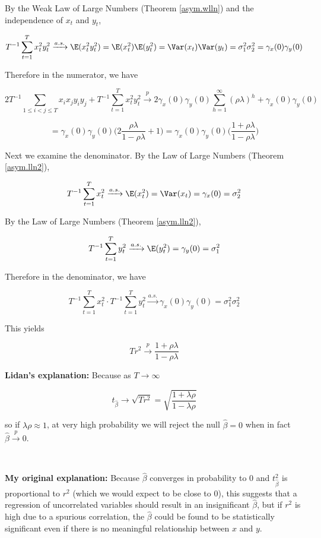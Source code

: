 \begin{enumerate}[(a)]
By the Weak Law of Large Numbers (Theorem \ref{asym.wlln}) and the independence of \(x_t\) and \(y_t\),

\[
T^{-1}\sum_{t=1}^T x_t^2y_t^2 \xrightarrow{a.s.} \E(x_t^2 y_t^2) = \E(x_t^2) \E( y_t^2) = \Var(x_t) \Var(y_t) = \sigma_1^2 \sigma_2^2 = \gamma_x(0) \gamma_y(0)
\]

Therefore in the numerator, we have

\[
2T^{-1} \sum_{1 \leq i < j \leq T} x_ix_j y_i y_j + T^{-1}\sum_{t=1}^T x_t^2y_t^2 \xrightarrow{p} 2 \gamma_x(0) \gamma_y(0)   \sum_{h=1}^{\infty}    (\rho \lambda)^h  + \gamma_x(0) \gamma_y(0) 
\]

\[
=  \gamma_x(0) \gamma_y(0)  \bigg( 2 \frac{\rho \lambda}{1 - \rho \lambda}     +1 \bigg)  =  \gamma_x(0) \gamma_y(0)  \bigg(  \frac{1 + \rho \lambda}{1 - \rho \lambda}      \bigg) 
\]

Next we examine the denominator. By the Law of Large Numbers (Theorem \ref{asym.lln2}),

\[
T^{-1}\sum_{t=1}^T x_t^2 \xrightarrow{a.s.} \E(x_t^2) = \Var(x_t) =  \gamma_x(0) = \sigma_2^2
\]

By the Law of Large Numbers (Theorem \ref{asym.lln2}),

\[
T^{-1}\sum_{t=1}^T y_t^2 \xrightarrow{a.s.} \E(y_t^2)  = \gamma_y(0) = \sigma_1^2
\]

Therefore in the denominator, we have

\[
T^{-1}\sum_{t=1}^T x_t^2 \cdot T^{-1} \sum_{t=1}^T y_t^2  \xrightarrow{a.s.} \gamma_x(0) \gamma_y(0) = \sigma_1^2 \sigma_2^2
\]

This yields

\[
\boxed{
Tr^2 \xrightarrow{p}  \frac{1 + \rho \lambda}{1 - \rho \lambda} }
\]

\end{enumerate}

\textbf{Lidan's explanation:} Because as \(T \to \infty\)

\[
t_{\hat{\beta}} \to \sqrt{Tr^2} = \sqrt{ \frac{1 + \lambda \rho}{1 - \lambda \rho}}
\]

so if \(\lambda \rho \approx 1\), at very high probability we will reject the null \(\hat{\beta} = 0\) when in fact \(\hat{\beta} \xrightarrow{p} 0\).

\

\textbf{My original explanation:} Because \(\hat{\beta}\) converges in probability to 0 and \(t_{\hat{\beta}}^2\) is proportional to \(r^2\) (which we would expect to be close to 0), this suggests that a regression of uncorrelated variables should result in an insignificant \(\hat{\beta}\), but if \(r^2\) is high due to a spurious correlation, the \(\hat{\beta}\) could be found to be statistically significant even if there is no meaningful relationship between \(x\) and \(y\).

